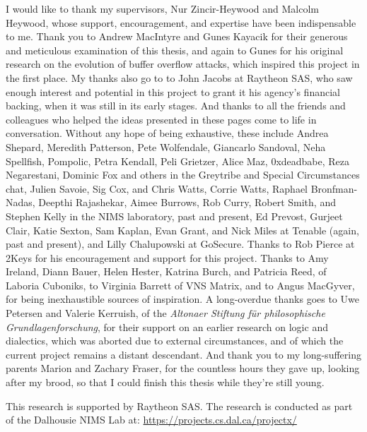 \printnoidxglossaries
\clearpage
{}

\begin{acknowledgements}
I would like to thank my supervisors, Nur
Zincir-Heywood and Malcolm Heywood, whose support, encouragement, and expertise
have been indispensable to me. Thank you to Andrew MacIntyre and Gunes Kayacik
for their generous and meticulous examination of this thesis, and again to Gunes
for his original research on the evolution of buffer overflow attacks, which inspired
this project in the first place. My thanks also go to to John Jacobs at Raytheon
SAS, who saw enough interest and potential in this project to grant it his
agency's financial backing, when it was still in its early stages. And thanks to
all the friends and colleagues who helped the ideas presented in these pages
come to life in conversation. Without any hope of being exhaustive, these
include Andrea Shepard, Meredith Patterson, Pete Wolfendale, Giancarlo Sandoval,
Neha Spellfish, Pompolic, Petra Kendall, Peli Grietzer, Alice Maz, 0xdeadbabe,
Reza Negarestani, Dominic Fox and others in the Greytribe and Special
Circumstances chat, Julien Savoie, Sig Cox, and Chris Watts, Corrie Watts,
Raphael Bronfman-Nadas, Deepthi Rajashekar, Aimee Burrows, Rob Curry, Robert
Smith, and Stephen Kelly in the NIMS laboratory, past and present, Ed Prevost,
Gurjeet Clair, Katie Sexton, Sam Kaplan, Evan Grant, and Nick Miles at Tenable
(again, past and present), and Lilly Chalupowski at GoSecure. Thanks to Rob
Pierce at 2Keys for his encouragement and support for this project. Thanks to
Amy Ireland, Diann Bauer, Helen Hester, Katrina Burch, and Patricia Reed, of
Laboria Cuboniks, to Virginia Barrett of VNS Matrix, and to Angus MacGyver, for
being inexhaustible sources of inspiration. A long-overdue thanks goes to Uwe
Petersen and Valerie Kerruish, of the \emph{Altonaer Stiftung für philosophische
Grundlagenforschung}, for their support on an earlier research on logic and
dialectics, which was aborted due to external circumstances, and of which the
current project remains a distant descendant. And thank you to my long-suffering
parents Marion and Zachary Fraser, for the countless hours they gave up, looking
after my brood, so that I could finish this thesis while they're still young.

This research is supported by Raytheon SAS. The research is conducted
as part of the Dalhousie NIMS Lab at: \url{https://projects.cs.dal.ca/projectx/}
\end{acknowledgements}

\clearpage
\mainmatter